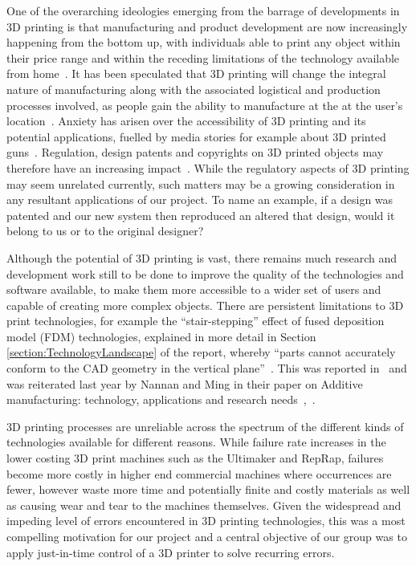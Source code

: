 \documentclass[pdftex, 11pt]{report} %
\begin{document}
One of the overarching ideologies emerging from the barrage of developments in 3D printing is that manufacturing and product development are now increasingly happening from the bottom up, with individuals able to print any object within their price range and within the receding limitations of the technology available from home~\cite{Birtchnell2013}. It has been speculated that 3D printing will change the integral nature of manufacturing along with the associated logistical and production processes involved, as people gain the ability to manufacture at the at the user's location~\cite{Birtchnell2013}. Anxiety has arisen over the accessibility of 3D printing and its potential applications, fuelled by media stories for example about 3D printed guns~\cite{Morelle2013}. Regulation, design patents and copyrights on 3D printed objects may therefore have an increasing impact~\cite{Birtchnell2013}. While the regulatory aspects of 3D printing may seem unrelated currently, such matters may be a growing consideration in any resultant applications of our project. To name an example, if a design was patented and our new system then reproduced an altered that design, would it belong to us or to the original designer?

Although the potential of 3D printing is vast, there remains much research and development work still to be done to improve the quality of the technologies and software available, to make them more accessible to a wider set of users and capable of creating more complex objects. There are persistent limitations to 3D print technologies, for example the ``stair-stepping'' effect of fused deposition model (FDM) technologies, explained in more detail in Section \ref{section:TechnologyLandscape} of the report, whereby ``parts cannot accurately conform to the CAD geometry in the vertical plane''~\cite{Onuh1999}. This was reported in~\citep{Onuh1999} and was reiterated last year by Nannan and Ming in their paper on Additive manufacturing: technology, applications and research needs~\cite{Guo2013},~\cite{Onuh1999}.

3D printing processes are unreliable across the spectrum of the different kinds of technologies available for different reasons. While failure rate increases in the lower costing 3D print machines such as the Ultimaker and RepRap, failures become more costly in higher end commercial machines where occurrences are fewer, however waste more time and potentially finite and costly materials as well as causing wear and tear to the machines themselves. Given the widespread and impeding level of errors encountered in 3D printing technologies, this was a most compelling motivation for our project and a central objective of our group was to apply just-in-time control of a 3D printer to solve recurring errors. 
\end{document}
